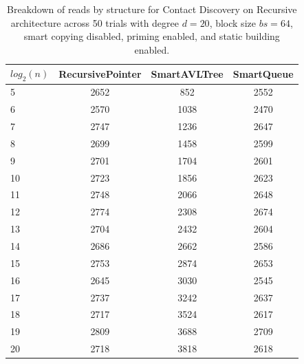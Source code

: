 \begin{table}[]
\centering
\begin{tabular}{|l|c|c|c|}
$log_2(n)$ & RecursivePointer & SmartAVLTree & SmartQueue \\ \hline
5 & 2652 & 852 & 2552 \\ \hline
6 & 2570 & 1038 & 2470 \\ \hline
7 & 2747 & 1236 & 2647 \\ \hline
8 & 2699 & 1458 & 2599 \\ \hline
9 & 2701 & 1704 & 2601 \\ \hline
10 & 2723 & 1856 & 2623 \\ \hline
11 & 2748 & 2066 & 2648 \\ \hline
12 & 2774 & 2308 & 2674 \\ \hline
13 & 2704 & 2432 & 2604 \\ \hline
14 & 2686 & 2662 & 2586 \\ \hline
15 & 2753 & 2874 & 2653 \\ \hline
16 & 2645 & 3030 & 2545 \\ \hline
17 & 2737 & 3242 & 2637 \\ \hline
18 & 2717 & 3524 & 2617 \\ \hline
19 & 2809 & 3688 & 2709 \\ \hline
20 & 2718 & 3818 & 2618 \\ \hline
\end{tabular}
\caption{Breakdown of reads by structure for Contact Discovery on Recursive architecture across 50 trials with degree $d=20$, block size $bs=64$, smart copying disabled, priming enabled, and static building enabled.}
    \label{tab:reads_by_structure_cd_d20_bs64_trials50_copiesfalse_primetrue_staticinsertiontrue_ptrecursive_movetrue}
\end{table}

